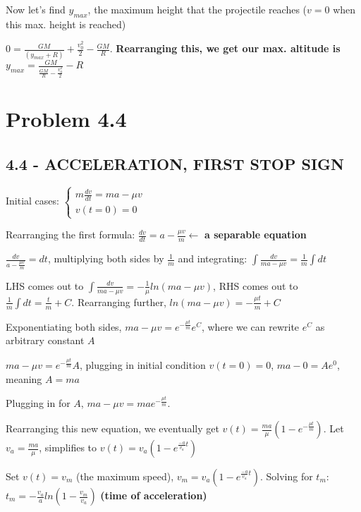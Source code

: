 \documentclass{article}
\begin{document}
\noindent Now let's find $y_{max}$, the maximum height that the projectile reaches ($v = 0$ when this max. height is reached) \par

\noindent $0 = \frac{GM}{(y_{max} + R)} + \frac{v_{0}^{2}}{2} - \frac{GM}{R}$.  \textbf{Rearranging this, we get our max. altitude is $y_{max} = \frac{GM}{\frac{GM}{R} - \frac{v_{0}^{2}}{2}} - R$} 

\section{Problem 4.4}
\subsection{4.4 - ACCELERATION, FIRST STOP SIGN}
Initial cases:
$\begin{cases}
    m \frac{dv}{dt} = ma - \mu v \\
    v(t = 0) = 0
    \end{cases}$ \par\vspace{0.25cm}
    
\noindent Rearranging the first formula: $\frac{dv}{dt} = a - \frac{\mu v}{m} \leftarrow$ \textbf{a separable equation} \par
\noindent $\frac{dv}{a - \frac{\mu v}{m}} = dt$, multiplying both sides by $\frac{1}{m}$ and integrating: $\int \frac{dv}{ma - \mu v} = \frac{1}{m} \int dt$ \par
\noindent LHS comes out to $\int \frac{dv}{ma - \mu v} = -\frac{1}{\mu}ln(ma - \mu v)$, RHS comes out to $\frac{1}{m} \int dt = \frac{t}{m} + C$.  Rearranging further, $ln(ma - \mu v) = -\frac{\mu t}{m} + C$ \par
\noindent Exponentiating both sides, $ma - \mu v = e^{-\frac{\mu t}{m}}e^{C}$, where we can rewrite $e^{C}$ as arbitrary constant $A$ \par
\noindent $ma - \mu v = e^{-\frac{\mu t}{m}}A$, plugging in initial condition $v(t = 0) = 0$, $ma - 0 = Ae^{0}$, meaning $A = ma$ \par
\noindent Plugging in for $A$, $ma - \mu v = mae^{-\frac{\mu t}{m}}$. \par
\noindent Rearranging this new equation, we eventually get $v(t) = \frac{ma}{\mu}(1 - e^{-\frac{\mu t}{m}})$.  Let $v_{a} = \frac{ma}{\mu}$, simplifies to $v(t) = v_{a}(1 - e^{\frac{-a}{v_{a}} t})$ \par
\noindent Set $v(t) = v_{m}$ (the maximum speed), $v_{m} = v_{a}(1 - e^{\frac{-a}{v_{a}} t})$.  Solving for $t_{m}$: $t_{m} = -\frac{v_{a}}{a}ln(1 - \frac{v_{m}}{v_{a}})$ \textbf{(time of acceleration)} \par\vspace{0.25cm}
\end{document}
